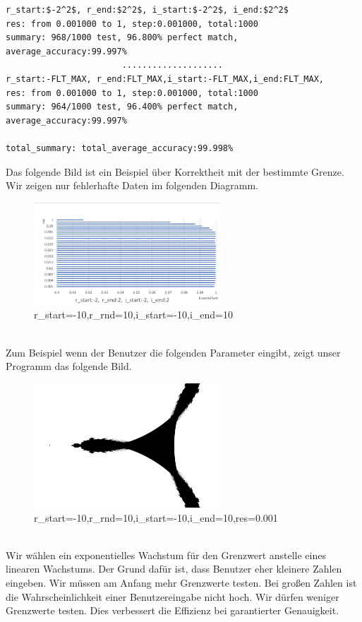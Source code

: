 \documentclass[course=erap]{aspdoc}
\begin{document}
 \begin{lstlisting}[mathescape=true]
r_start:$-2^2$, r_end:$2^2$, i_start:$-2^2$, i_end:$2^2$
res: from 0.001000 to 1, step:0.001000, total:1000
summary: 968/1000 test, 96.800% perfect match, average_accuracy:99.997%
                       ....................
r_start:-FLT_MAX, r_end:FLT_MAX,i_start:-FLT_MAX,i_end:FLT_MAX,
res: from 0.001000 to 1, step:0.001000, total:1000
summary: 964/1000 test, 96.400% perfect match, average_accuracy:99.997%

total_summary: total_average_accuracy:99.998%
\end{lstlisting}
Das folgende Bild ist ein Beispiel über Korrektheit mit der bestimmte Grenze. Wir zeigen nur fehlerhafte Daten im folgenden Diagramm.
\begin{figure}[htb]
\centering
\includegraphics [width=7cm] {Korrektheit.jpg}
\caption{r\_start=-10,r\_rnd=10,i\_start=-10,i\_end=10}
\label{fig:label}
\end{figure}
\\Zum Beispiel wenn der Benutzer die folgenden Parameter eingibt, zeigt unser Programm das folgende Bild.
\begin{figure}[htb]
\centering
\includegraphics [width=7cm] {ddd.png}
\caption{r\_start=-10,r\_rnd=10,i\_start=-10,i\_end=10,res=0.001}
\label{fig:label}
\end{figure}
\\Wir wählen ein exponentielles Wachstum für den Grenzwert anstelle eines linearen Wachstums. Der Grund dafür ist, dass Benutzer eher kleinere Zahlen eingeben. Wir müssen am Anfang mehr Grenzwerte testen. Bei großen Zahlen ist die Wahrscheinlichkeit einer Benutzereingabe nicht hoch. Wir dürfen weniger Grenzwerte testen. Dies verbessert die Effizienz bei garantierter Genauigkeit.
\end{document}
